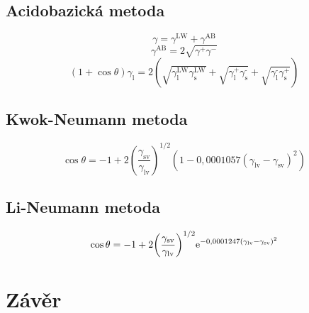\documentclass{protokol}
\begin{document}
\subsection{Acidobazická metoda}
\begin{equation}
	\gamma = \gamma^{\text{LW}} + \gamma^{\text{AB}}
\end{equation}
\begin{equation}
	\gamma^{\text{AB}} = 2\sqrt{\gamma^+\gamma^-}
\end{equation}
\begin{equation}
		\left(1+\cos\theta\right)\gamma_{\text{l}} = 
		2\left(\sqrt{\gamma_\text{l}^{\text{LW}}\gamma_\text{s}^{\text{LW}}} + 
		\sqrt{\gamma_\text{l}^{\text{+}}\gamma_\text{s}^{\text{-}}} + 
		\sqrt{\gamma_\text{l}^{\text{-}}\gamma_\text{s}^{\text{+}}}\right)
\end{equation}
\par 

\subsection{Kwok-Neumann metoda}
\begin{equation}
	\cos\theta = -1 + 
2 {\left(\frac{\gamma_{\text{sv}}}{\gamma_{\text{lv}}}\right)}^{1/2} 
\left(1-0,0001057(\gamma_{\text{lv}} - \gamma_{\text{sv}})^2\right)
\end{equation}
\par 

\subsection{Li-Neumann metoda}
\begin{equation}
	\cos\theta = -1 + 
	2 {\left( \frac{\gamma_{\text{sv}}} {\gamma_{\text{lv}}} \right)}^{1/2} 
	\mathrm{e}^{-0,0001247(\gamma_{\text{lv}} - \gamma_{\text{sv}})^2}
\end{equation}
\par 





\section{Závěr}
\end{document}

